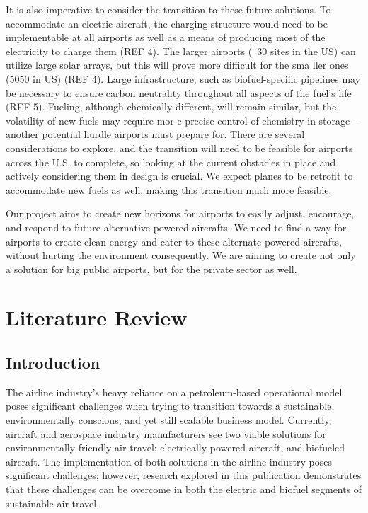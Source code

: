 \documentclass{article}
\begin{document}
It is also imperative to consider the transition to these future solutions. 
To accommodate an electric aircraft, the charging structure would need to be implementable at all airports as well as a means of producing most of the electricity to charge them (REF 4). 
The larger airports (~30 sites in the US) can utilize large solar arrays, but this will prove more difficult for the sma ller ones (5050 in US) (REF 4). 
Large infrastructure, such as biofuel-specific pipelines may be necessary to ensure carbon neutrality throughout all aspects of the fuel's life (REF 5). 
Fueling, although chemically different, will remain similar, but the volatility of new fuels may require mor e precise control of chemistry in storage – another potential hurdle airports must prepare for. 
There are several considerations to explore, and the transition will need to be feasible for airports across the U.S. to complete, so looking at the current obstacles in place and actively considering them in design is crucial. 
We expect planes to be retrofit to accommodate new fuels as well, making this transition much more feasible.\par


Our project aims to create new horizons for airports to easily adjust, encourage, and respond to future alternative powered aircrafts. 
We need to find a way for airports to create clean energy and cater to these alternate powered aircrafts, without hurting the environment consequently. 
We are aiming to create not only a solution for big public airports, but for the private sector as well.

\newpage

\section{Literature Review}\label{litRev}
 
\subsection{Introduction}\label{litIntro}
The airline industry's heavy reliance on a petroleum-based operational model poses significant challenges when trying to transition towards a sustainable, environmentally conscious, and yet still scalable business model. 
Currently, aircraft and aerospace industry manufacturers see two viable solutions for environmentally friendly air travel: electrically powered aircraft, and biofueled aircraft. 
The implementation of both solutions in the airline industry poses significant challenges; however, research explored in this publication demonstrates that these challenges can be overcome in both the electric and biofuel segments of sustainable air travel.\par
\end{document}
